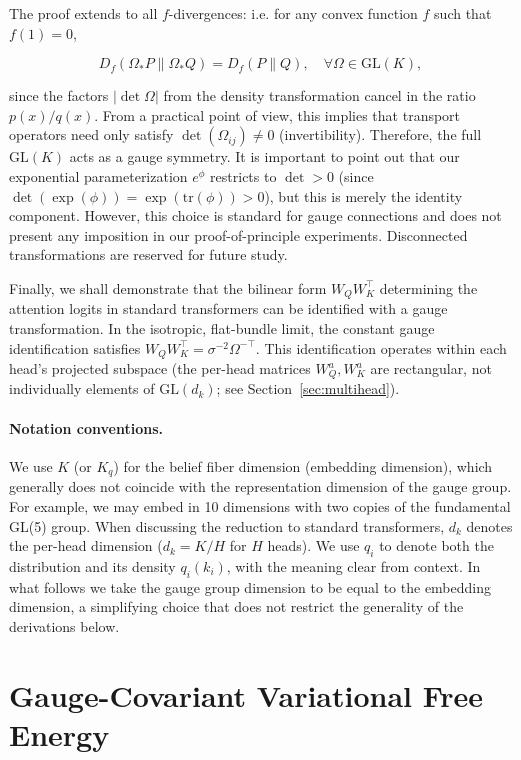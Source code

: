 \documentclass[twoside,11pt]{article}
\begin{document}
The proof extends to all $f$-divergences: i.e. for any convex function $f$ such that $f(1) = 0$,

\begin{equation}
D_f(\Omega_* P \| \Omega_* Q) = D_f(P \| Q), \quad \forall \Omega \in \mathrm{GL}(K),
\end{equation}

since the factors $|\det\Omega|$ from the density transformation cancel in the ratio $p(x)/q(x)$. From a practical point of view, this implies that transport operators need only satisfy $\det(\Omega_{ij}) \neq 0$ (invertibility). Therefore, the full $\mathrm{GL}(K)$ acts as a gauge symmetry. It is important to point out that our exponential parameterization $e^{\phi}$ restricts to $\det > 0$ (since $\det(\exp(\phi)) = \exp(\mathrm{tr}(\phi)) > 0$), but this is merely the identity component. However, this choice is standard for gauge connections and does not present any imposition in our proof-of-principle experiments. Disconnected transformations are reserved for future study. 

Finally, we shall demonstrate that the bilinear form $W_Q W_K^\top$ determining the attention logits in standard transformers can be identified with a gauge transformation. In the isotropic, flat-bundle limit, the constant gauge identification satisfies $W_Q W_K^\top = \sigma^{-2}\Omega^{-\top}$. This identification operates within each head's projected subspace (the per-head matrices $W_Q^a, W_K^a$ are rectangular, not individually elements of $\mathrm{GL}(d_k)$; see Section~\ref{sec:multihead}).


\paragraph{Notation conventions.} We use $K$ (or $K_q$) for the belief fiber dimension (embedding dimension), which generally does not coincide with the representation dimension of the gauge group. For example, we may embed in 10 dimensions with two copies of the fundamental GL(5) group. When discussing the reduction to standard transformers, $d_k$ denotes the per-head dimension ($d_k = K/H$ for $H$ heads). We use $q_i$ to denote both the distribution and its density $q_i(k_i)$, with the meaning clear from context. In what follows we take the gauge group dimension to be equal to the embedding dimension, a simplifying choice that does not restrict the generality of the derivations below.

\section{Gauge-Covariant Variational Free Energy}
\label{sec:free_energy_section}
\end{document}
